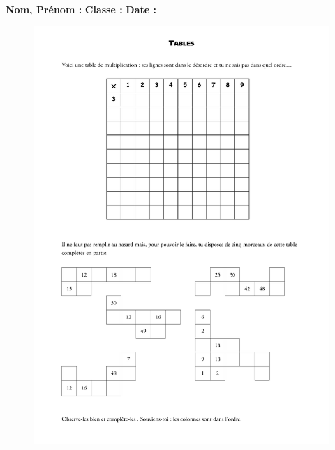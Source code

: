 



\textbf{Nom, Prénom :} \hspace{8cm} \textbf{Classe :} \hspace{3cm} \textbf{Date :}\\

\begin{figure}[H]
  \centering
  \includegraphics[width=0.8\linewidth]{4xDM/tables.pdf}
\end{figure}

\newpage

